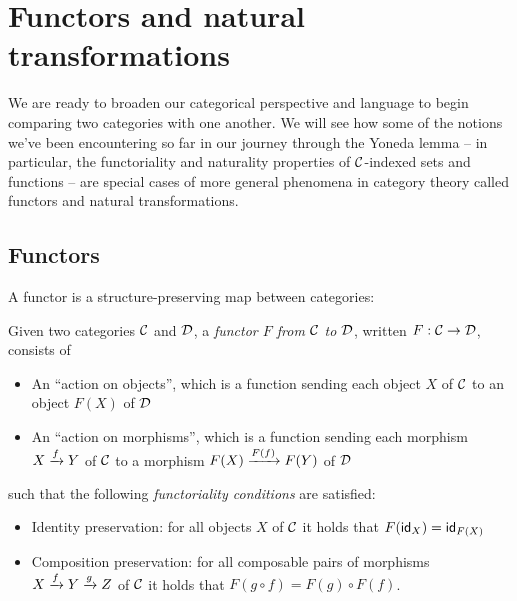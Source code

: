 
\chapter{Functors and natural transformations}
We are ready to broaden our categorical perspective and language to begin 
comparing two categories with one another. We will see how some of the notions 
we've been encountering so far in our journey through the Yoneda 
lemma -- in particular, the functoriality and naturality properties of 
$\mathcal C$-indexed sets and functions -- are special cases of more general 
phenomena in category theory called functors and natural transformations.


\section{Functors}
A functor is a structure-preserving map between categories:

\begin{definition}[Functor]
  \sloppy
  Given two categories \(\mathcal C\) and \(\mathcal D\),
  a \emph{functor \(F\) from \(\mathcal C\) to \(\mathcal D\)},
  written
  \(F : \mathcal C \to \mathcal D\),
  consists of \begin{itemize}
    \item An ``action on objects'', which is a function sending each object \(X\) of \(\mathcal C\) to an object \(F(X)\) of \(\mathcal D\)
    \item An ``action on morphisms'', which is a function sending each morphism \(X \xrightarrow{f} Y\) of \(\mathcal C\) to a morphism \(F(X) \xrightarrow{F(f)} F(Y)\)
      of \(\mathcal D\)
  \end{itemize}
  such that the following \emph{functoriality conditions} are satisfied:
  \begin{itemize}
  \item Identity preservation: for all objects \(X\) of \(\mathcal C\) it holds that \(F(\mathsf{id}_X) = \mathsf{id}_{F(X)}\)
  \item Composition preservation: for all composable pairs of morphisms \(X \xrightarrow{f} Y \xrightarrow{g} Z\) of \(\mathcal C\)
    it holds that \(F(g \circ f) = F(g) \circ F(f)\).
  \end{itemize}
\end{definition}

